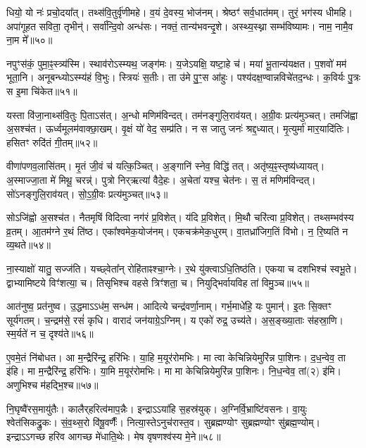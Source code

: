 धियो॒ यो नः॑ प्रचो॒दया᳚त्। तथ्स॑वि॒तुर्वृ॑णीमहे। 
व॒यं दे॒वस्य॒ भोज॑नम्। श्रेष्ठꣳ॑ सर्व॒धात॑मम्। 
तुरं॒ भग॑स्य धीमहि। अपा॑गूहत सविता॒ तृभीन्॑। 
सर्वा᳚न्दि॒वो अन्ध॑सः। नक्तं॒ तान्य॑\-भवन्दृ॒शे। 
अस्थ्य॒स्थ्ना सम्भ॑विष्यामः। नाम॒ नामै॒व ना॒म मे᳚॥५०॥\ip


नपुꣳस॑कं॒ पुमा॒ꣴ॒स्त्र्य॑स्मि। स्थाव॑रो\-ऽस्म्यथ॒ जङ्ग॑मः। 
य॒जे\-ऽयक्षि॒ यष्टा॒हे च॑। मया॑ भू॒तान्य॑यक्षत। 
प॒शवो॑ मम॑ भूता॒नि। अनूबन्ध्यो\-ऽस्म्य॑हं वि॒भुः। 
स्त्रियः॑ स॒तीः। ता उ॑मे पु॒ꣳ॒स आ॑हुः। 
पश्य॑दक्ष॒ण्वान्नविचे॑तद॒न्धः। क॒विर्यः पु॒त्रः स इ॒मा चि॑केत॥५१॥\ip


यस्ता वि॑जा॒नाथ्स॑वि॒तुः पि॒ता\-ऽस॑त्। अ॒न्धो मणिम॑विन्दत्। 
तम॑नङ्गुलि॒राव॑यत्। अ॒ग्री॒वः प्रत्य॑मुञ्चत्। 
तमजि॑ह्वा अ॒सश्च॑त। ऊर्ध्वमूलम॑वाक्छा॒खम्। 
वृ॒क्षं यो॑ वेद॒ सम्प्र॑ति। न स जातु जनः॑ श्रद्द॒ध्यात्। 
मृ॒त्युर्मा॑ मार॒यादि॑तिः। हसितꣳ रुदि॑तं गी॒तम्॥५२॥\ip


वीणा॑पणव॒लासि॑तम्। मृ॒तं जी॒वं च॑ यत्कि॒ञ्चित्। 
अ॒ङ्गानि॑ स्नेव॒ विद्धि॑ तत्। अतृ॑ष्य॒ꣴ॒स्तृष्य॑ध्यायत्। 
अ॒स्माज्जा॒ता मे॑ मिथू॒ चरन्न्॑। पुत्रो निर्‌ऋत्या॑ वैदे॒हः। 
अ॒चेता॑ यश्च॒ चेत॑नः। स॒ तं मणिम॑विन्दत्। 
सो॑\-ऽनङ्गुलि॒राव॑यत्। सो॒\-ऽ॒\-ग्री॒वः प्रत्य॑मुञ्चत्॥५३॥\ip


सो\-ऽजि॑ह्वो अ॒सश्च॑त। नैतमृषिं विदित्वा नग॑रं प्र॒विशेत्। 
य॑दि प्र॒विशेत्। मि॒थौ चरि॑त्वा प्र॒विशेत्। 
तथ्सम्भव॑स्य व्र॒तम्। आ॒तम॑ग्ने र॒थं ति॑ष्ठ। 
एका᳚श्वमेक॒योज॑नम्। एकचक्र॑मेक॒धुरम्। 
वा॒तध्रा॑जिग॒तिं वि॑भो। न॒ रि॒ष्यति॑ न व्य॒थते॥५४॥\ip


ना॒स्याक्षो॑ यातु॒ सज्ज॑ति। यच्छ्वेता᳚न्‌ रोहि॑ताꣴश्चा॒ग्नेः। 
र॒थे यु॑क्त्वा\-ऽधि॒\-तिष्ठ॑ति। एकया च दशभिश्च॑ स्वभू॒ते। 
द्वाभ्यामिष्टये विꣳ॑शत्या॒ च। तिसृभिश्च वहसे त्रिꣳ॑शता॒ च। 
नियुद्भिर्वायविह ता॑ विमु॒ञ्च॥५५॥\ip\anuvakamend


आत॑नुष्व॒ प्रत॑नुष्व। उ॒द्धमा\-ऽऽध॑म॒ सन्ध॑म। 
आदित्ये चन्द्र॑वर्णा॒नाम्। गर्भ॒माधे॑हि॒ यः पुमान्॑। 
इ॒तः सि॒क्तꣳ सूर्य॑गतम्। च॒न्द्रम॑से॒ रसं॑ कृधि। 
वारादं जन॑याग्रे॒\-ऽग्निम्। य एको॑ रुद्र॒ उच्य॑ते। 
अ॒स॒ङ्ख्या॒ताः स॑हस्रा॒णि। स्म॒र्यते॑ न च॒ दृश्य॑ते॥५६॥\ip


ए॒वमे॒तं नि॑बोधत। आ म॒न्द्रैरि॑न्द्र॒ हरि॑भिः। 
या॒हि म॒यूर॑रोमभिः। मा त्वा केचिन्नियेमुरि॑न्न पा॒शिनः। 
द॒ध॒न्वेव॒ ता इ॑हि। मा म॒न्द्रैरि॑न्द्र॒ हरि॑भिः। 
या॒मि म॒यूर॑रोमभिः। मा मा केचिन्नियेमुरि॑न्न पा॒शिनः। 
नि॒ध॒न्वेव॒ \mbox{तां(२)} इ॑मि। अणुभिश्च म॑हद्भि॒श्च॥५७॥\ip


नि॒घृष्वै॑रस॒मायु॑तैः। कालैर्‌हरित्व॑माप॒न्नैः। 
इन्द्रा\-ऽऽया॑हि स॒हस्र॑\-युक्। अ॒ग्निर्वि॒भ्राष्टि॑वसनः। 
वा॒युः श्वेत॑सिकद्रु॒कः। सं॒व॒थ्स॒रो वि॑षू॒\-वर्णैः᳚। 
नित्या॒स्ते\-ऽनु\-च॑रास्त॒व। सुब्रह्मण्योꣳ सुब्रह्मण्योꣳ सु॑ब्रह्म॒ण्योम्। 
इन्द्रा\-ऽऽगच्छ हरिव आगच्छ मे॑धाति॒थेः। मेष वृषणश्व॑स्य मे॒ने॥५८॥\ip


